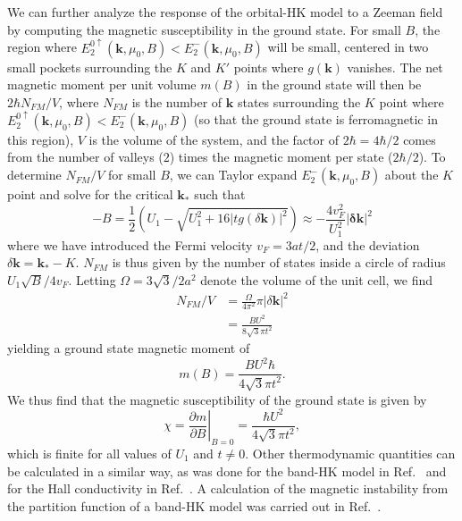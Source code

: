 \documentclass[prb,aps,amssymb,twocolumn,notitlepage]{revtex4-2}
\begin{document}
We can further analyze the response of the orbital-HK model to a Zeeman field by computing the magnetic susceptibility in the ground state.  
For small $B$, the region where $E^{0\uparrow}_{2}(\mathbf{k},\mu_0,B) < E^-_{2}(\mathbf{k},\mu_0,B)$ will be small, centered in two small pockets surrounding the $K$ and $K'$ points where $g(\mathbf{k})$ vanishes. 
The net magnetic moment per unit volume $m(B)$ in the ground state will then be $2\hbar N_{FM}/V$, where $N_{FM}$ is the number of $\mathbf{k}$ states surrounding the $K$ point where $E^{0\uparrow}_{2}(\mathbf{k},\mu_0,B) < E^-_{2}(\mathbf{k},\mu_0,B)$ (so that the ground state is ferromagnetic in this region), $V$ is the volume of the system, and the factor of $2\hbar=4\hbar/2$ comes from the number of valleys ($2$) times the magnetic moment per state ($2\hbar/2$). 
To determine $N_{FM}/V$ for small $B$, we can Taylor expand $E^-_{2}(\mathbf{k},\mu_0,B)$ about the $K$ point and solve for the critical $\mathbf{k_*}$ such that 
\begin{equation}
-B = \frac{1}{2}\left(U_{1}-\sqrt{U^2_{1}+16|tg(\delta\mathbf{k})|^2}\right) \approx -\frac{4v_F^2}{U_1^2}|\mathbf{\delta k}|^2
\end{equation}
where we have introduced the Fermi velocity $v_F = 3at/2$, and the deviation $\delta\mathbf{k} = \mathbf{k_*}-K$. $N_{FM}$ is thus given by the number of states inside a circle of radius $U_1\sqrt{B}/4v_F$. 
Letting $\Omega=3\sqrt{3}/2 a^2$ denote the volume of the unit cell, we find
\begin{align}
N_{FM}/V &= \frac{\Omega}{4\pi^2}\pi |\delta\mathbf{k}|^2 \\
&= \frac{BU^2}{8\sqrt{3}\pi t^2}
\end{align}
yielding a ground state magnetic moment of
\begin{equation}
m(B) = \frac{BU^2\hbar}{4\sqrt{3}\pi t^2}.
\end{equation}
We thus find that the magnetic susceptibility of the ground state is given by
\begin{equation}
\chi = \left.\frac{\partial m}{\partial B}\right|_{B=0} = \frac{\hbar U^2}{4\sqrt{3}\pi t^2},
\end{equation}
which is finite for all values of $U_1$ and $t\neq 0$. 
Other thermodynamic quantities can be calculated in a similar way, as was done for the band-HK model in Ref.~\cite{zhao2021determination} and for the Hall conductivity in Ref.~\cite{zhao2023failure}. A calculation of the magnetic instability from the partition function of a band-HK model was carried out in Ref.~\cite{zhao2023proof}.
\end{document}
